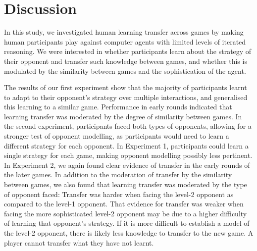 \documentclass[
  english,
  man,floatsintext]{apa6}
\begin{document}
\hypertarget{discussion-2}{%
\section{Discussion}\label{discussion-2}}

In this study, we investigated human learning transfer across games by making human participants play against computer agents with limited levels of iterated reasoning. We were interested in whether participants learn about the strategy of their opponent and transfer such knowledge between games, and whether this is modulated by the similarity between games and the sophistication of the agent.

The results of our first experiment show that the majority of participants learnt to adapt to their opponent's strategy over multiple interactions, and generalised this learning to a similar game. Performance in early rounds indicated that learning transfer was moderated by the degree of similarity between games. In the second experiment, participants faced both types of opponents, allowing for a stronger test of opponent modelling, as participants would need to learn a different strategy for each opponent. In Experiment 1, participants could learn a single strategy for each game, making opponent modelling possibly less pertinent. In Experiment 2, we again found clear evidence of transfer in the early rounds of the later games. In addition to the moderation of transfer by the similarity between games, we also found that learning transfer was moderated by the type of opponent faced: Transfer was harder when facing the level-2 opponent as compared to the level-1 opponent. That evidence for transfer was weaker when facing the more sophisticated level-2 opponent may be due to a higher difficulty of learning that opponent's strategy. If it is more difficult to establish a model of the level-2 opponent, there is likely less knowledge to transfer to the new game. A player cannot transfer what they have not learnt.
\end{document}

